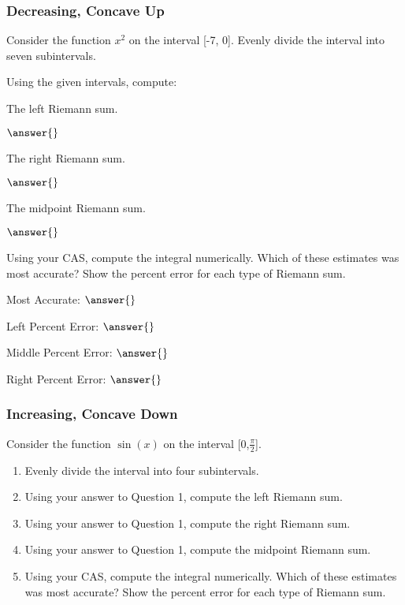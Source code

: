\documentclass{ximera}
\begin{document}
\subsubsection{Decreasing, Concave Up}
\begin{question}
Consider the function $x^2$ on the interval [-7, 0]. Evenly divide the interval into seven subintervals.

Using the given intervals, compute:

The left Riemann sum.

$\answer{}$

The right Riemann sum.

$\answer{}$

The midpoint Riemann sum.

$\answer{}$

Using your CAS, compute the integral numerically. Which of these estimates was most accurate? Show the percent error for each type of Riemann sum.

Most Accurate: $\answer{}$

Left Percent Error: $\answer{}$

Middle Percent Error: $\answer{}$

Right Percent Error: $\answer{}$
\end{question}

\subsubsection{Increasing, Concave Down}
Consider the function $\sin(x)$ on the interval [0,$\frac{\pi}{2}$].
\begin{enumerate}
\item{Evenly divide the interval into four subintervals.}
\item{Using your answer to Question 1, compute the left Riemann sum.}
\item{Using your answer to Question 1, compute the right Riemann sum.}
\item{Using your answer to Question 1, compute the midpoint Riemann sum.}
\item{Using your CAS, compute the integral numerically. Which of these estimates was most accurate? Show the percent error for each type of Riemann sum.}
\end{enumerate}
\end{document}
